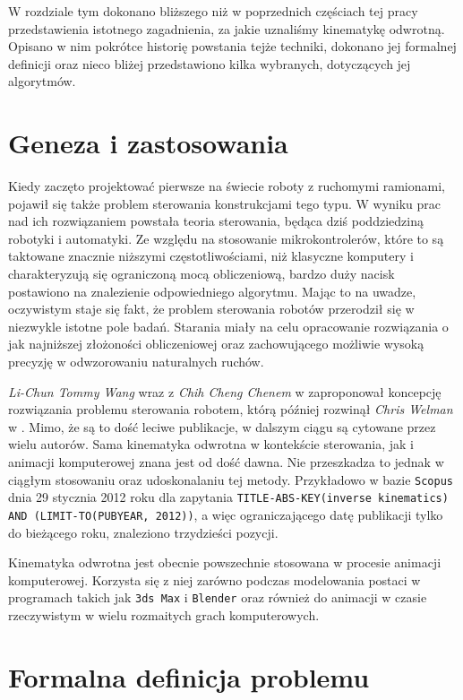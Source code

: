 \documentclass[11pt]{mwrep}
\begin{document}
W rozdziale tym dokonano bliższego niż w poprzednich częściach tej pracy przedstawienia istotnego zagadnienia, za jakie uznaliśmy kinematykę odwrotną. Opisano w nim pokrótce historię powstania tejże techniki, dokonano jej formalnej definicji oraz nieco bliżej przedstawiono kilka wybranych, dotyczących jej algorytmów.

  \section{Geneza i zastosowania}

  Kiedy zaczęto projektować pierwsze na świecie roboty z ruchomymi ramionami, pojawił się także problem sterowania konstrukcjami tego typu. W wyniku prac nad ich rozwiązaniem powstała teoria sterowania, będąca dziś poddziedziną robotyki i automatyki. Ze względu na stosowanie mikrokontrolerów, które to są taktowane znacznie niższymi częstotliwościami, niż klasyczne komputery i charakteryzują się ograniczoną mocą obliczeniową, bardzo duży nacisk postawiono na znalezienie odpowiedniego algorytmu. Mając to na uwadze, oczywistym staje się fakt, że problem sterowania robotów przerodził się w niezwykle istotne pole badań. Starania miały na celu opracowanie rozwiązania o jak najniższej złożoności obliczeniowej oraz zachowującego możliwie wysoką precyzję w odwzorowaniu naturalnych ruchów.

  \textit{Li-Chun Tommy Wang} wraz z \textit{Chih Cheng Chenem} w \cite{ikrobot} zaproponował koncepcję rozwiązania problemu sterowania robotem, którą później rozwinął \textit{Chris Welman} w \cite{welman}. Mimo, że są to dość leciwe publikacje, w dalszym ciągu są cytowane przez wielu autorów. Sama kinematyka odwrotna w kontekście sterowania, jak i animacji komputerowej znana jest od dość dawna. Nie przeszkadza to jednak w ciągłym stosowaniu oraz udoskonalaniu tej metody. Przykładowo w bazie \texttt{Scopus} dnia 29 stycznia 2012 roku dla zapytania \verb|TITLE-ABS-KEY(inverse kinematics) AND (LIMIT-TO(PUBYEAR, 2012))|, a więc ograniczającego datę publikacji tylko do bieżącego roku, znaleziono trzydzieści pozycji.

  Kinematyka odwrotna jest obecnie powszechnie stosowana w procesie animacji komputerowej. Korzysta się z niej zarówno podczas modelowania postaci w programach takich jak \texttt{3ds Max} i \texttt{Blender} oraz również do animacji w czasie rzeczywistym w wielu rozmaitych grach komputerowych.
  
\section{Formalna definicja problemu}
\end{document}

